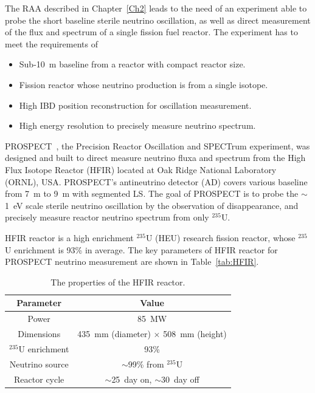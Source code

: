     
    The RAA described in Chapter~\ref{Ch2} leads to the need of an experiment able to probe the short baseline sterile neutrino oscillation, as well as direct measurement of the flux and spectrum of a single fission fuel reactor. 
    The experiment has to meet the requirements of 
    \begin{itemize}
        \item Sub-10~m baseline from a reactor with compact reactor size. 
        \item Fission reactor whose neutrino production is from a single isotope.
        \item High IBD position reconstruction for oscillation measurement.
        \item High energy resolution to precisely measure neutrino spectrum.
    \end{itemize}
    
    PROSPECT~\cite{bib:prospect_physics, bib:prospect_nim}, the Precision Reactor Oscillation and SPECTrum experiment, was designed and built to direct measure neutrino fluxa and spectrum from the High Flux Isotope Reactor (HFIR) located at Oak Ridge National Laboratory (ORNL), USA. 
    PROSPECT's antineutrino detector (AD) covers various baseline from 7~m to 9~m with segmented LS.
    The goal of PROSPECT is to probe the $\sim$1~eV scale sterile neutrino oscillation by the observation of \nuebar disappearance, and precisely measure reactor neutrino spectrum from only $^{235}$U.
    

    HFIR reactor is a high enrichment $^{235}$U (HEU) research fission reactor, whose $^{235}$U enrichment is 93\% in average.
    The key parameters of HFIR reactor for PROSPECT neutrino measurement are shown in Table~\ref{tab:HFIR}.
\begin{table}[h]
    \centering
    \caption[HFIR parameters]{The properties of the HFIR reactor.}
    \begin{tabular}{cc}
    \hline
    \hline
    Parameter  & Value   \\
    \hline
    Power    & 85~MW \\
    Dimensions     & 435~mm (diameter) $\times$ 508~mm (height) \\
    $^{235}$U enrichment & 93\% \\
    Neutrino source & $\sim$99\% from $^{235}$U \\
    Reactor cycle & $\sim$25~day on, $\sim$30~day off \\
    \hline
    \end{tabular}

\label{tab:HIFR}
\end{table}

